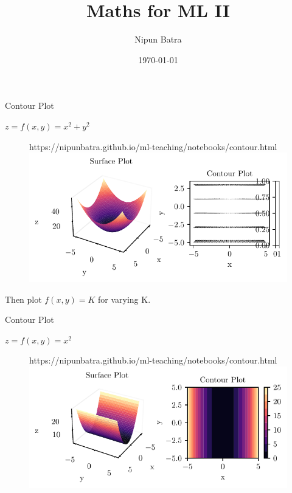 \documentclass{beamer}
\title{Maths for ML II}
\date{\today}
\author{Nipun Batra}
\institute{IIT Gandhinagar}
\begin{document}
  \maketitle
  
  
  


\begin{frame}{Contour Plot}

	$z = f(x,y) = x^{2} + y^{2}$\\

	\begin{figure}[htp]
		\centering
		\begin{notebookbox}{https://nipunbatra.github.io/ml-teaching/notebooks/contour.html}
		  \includegraphics[width=\linewidth]{../figures/mml/contour-x_squared_plus_y_squared.pdf}
		\end{notebookbox}
	  \end{figure}

Then plot $f(x,y)=K$ for varying K.

\end{frame}


\begin{frame}{Contour Plot}

$z = f(x,y) = x^{2}$\\

\begin{figure}[htp]
	\centering
	\begin{notebookbox}{https://nipunbatra.github.io/ml-teaching/notebooks/contour.html}
	  \includegraphics[width=\linewidth]{../figures/mml/contour-x_squared.pdf}
	\end{notebookbox}
  \end{figure}

\end{frame}
\end{document}
